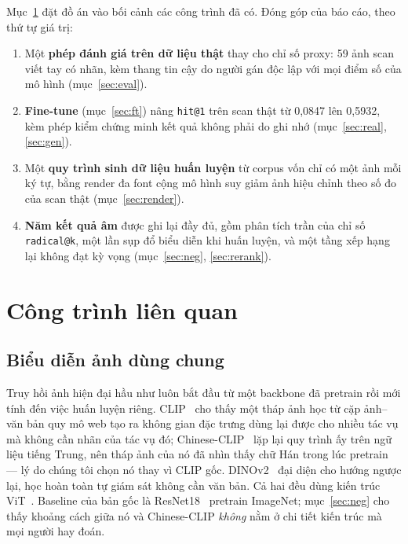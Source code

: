 \documentclass[conference,a4paper]{IEEEtran}
\newcommand{\code}[1]{{\small\texttt{#1}}}
\begin{document}
Mục~\ref{sec:related} đặt đồ án vào bối cảnh các công trình đã có.
Đóng góp của báo cáo, theo thứ tự giá trị:

\begin{enumerate}
  \item Một \textbf{phép đánh giá trên dữ liệu thật} thay cho chỉ số proxy: 59 ảnh scan viết tay có
        nhãn, kèm thang tin cậy do người gán độc lập với mọi điểm số của mô hình (mục~\ref{sec:eval}).
  \item \textbf{Fine-tune} (mục~\ref{sec:ft}) nâng \code{hit@1} trên scan thật từ 0,0847 lên
        0,5932, kèm phép kiểm chứng minh kết quả không phải do ghi nhớ (mục~\ref{sec:real},
        \ref{sec:gen}).
  \item Một \textbf{quy trình sinh dữ liệu huấn luyện} từ corpus vốn chỉ có một ảnh mỗi ký tự, bằng
        render đa font cộng mô hình suy giảm ảnh hiệu chỉnh theo số đo của scan thật
        (mục~\ref{sec:render}).
  \item \textbf{Năm kết quả âm} được ghi lại đầy đủ, gồm phân tích trần của chỉ số \code{radical@k},
        một lần sụp đổ biểu diễn khi huấn luyện, và một tầng xếp hạng lại không đạt kỳ vọng
        (mục~\ref{sec:neg}, \ref{sec:rerank}).
\end{enumerate}

\section{Công trình liên quan}
\label{sec:related}

\subsection{Biểu diễn ảnh dùng chung}

Truy hồi ảnh hiện đại hầu như luôn bắt đầu từ một backbone đã pretrain rồi mới tính đến việc huấn
luyện riêng. CLIP~\cite{clip} cho thấy một tháp ảnh học từ cặp ảnh--văn bản quy mô web tạo ra không
gian đặc trưng dùng lại được cho nhiều tác vụ mà không cần nhãn của tác vụ đó;
Chinese-CLIP~\cite{chineseclip} lặp lại quy trình ấy trên ngữ liệu tiếng Trung, nên tháp ảnh của nó
đã nhìn thấy chữ Hán trong lúc pretrain --- lý do chúng tôi chọn nó thay vì CLIP gốc.
DINOv2~\cite{dinov2} đại diện cho hướng ngược lại, học hoàn toàn tự giám sát không cần văn bản. Cả
hai đều dùng kiến trúc ViT~\cite{vit}. Baseline của bản gốc là ResNet18~\cite{resnet} pretrain
ImageNet; mục~\ref{sec:neg} cho thấy khoảng cách giữa nó và Chinese-CLIP \emph{không} nằm ở chi tiết
kiến trúc mà mọi người hay đoán.
\end{document}
